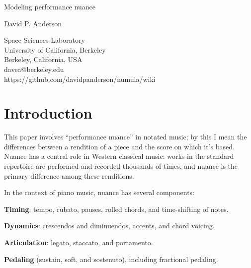 \documentclass[letterpaper, 12pt]{article}
\begin{document}
{\cmjTitle Modeling performance nuance}
\vspace*{24pt}

{\cmjAuthor David P. Anderson}

\begin{cmjAuthorAddress}
Space Sciences Laboratory \\
University of California, Berkeley \\
Berkeley, California, USA \\
davea@berkeley.edu \\
https://github.com/davidpanderson/numula/wiki
\end{cmjAuthorAddress}

\begin{abstract}

Music Nuance Model (MNM) is
a framework for describing nuance
(timing, articulation, dynamics, and piano pedaling)
in the performance of notated music.
MNM can concisely express complex nuance,
such as that of human performances,
thus allowing musicians -- composers and performers --
to craft expressive renditions of musical works.
This capability has applications in composition, virtual performance,
and performance pedagogy.
I discuss the challenges in creating and refining
complex nuance specifications,
and I describe Numula, a Python implementation of MNM.

\end{abstract}

\section{Introduction}

This paper involves ``performance nuance'' in notated music;
by this I mean the differences between a rendition of a piece
and the score on which it's based.
Nuance has a central role in Western classical music:
works in the standard repertoire
are performed and recorded thousands of times,
and nuance is the primary difference among these renditions.

In the context of piano music, nuance has several components:

\textbf{Timing}: tempo, rubato, pauses, rolled chords,
and time-shifting of notes.

\textbf{Dynamics}: crescendos and diminuendos, accents, and chord voicing.

\textbf{Articulation}: legato, staccato, and portamento.

\textbf{Pedaling} (sustain, soft, and sostenuto),
including fractional pedaling.
\end{document}
